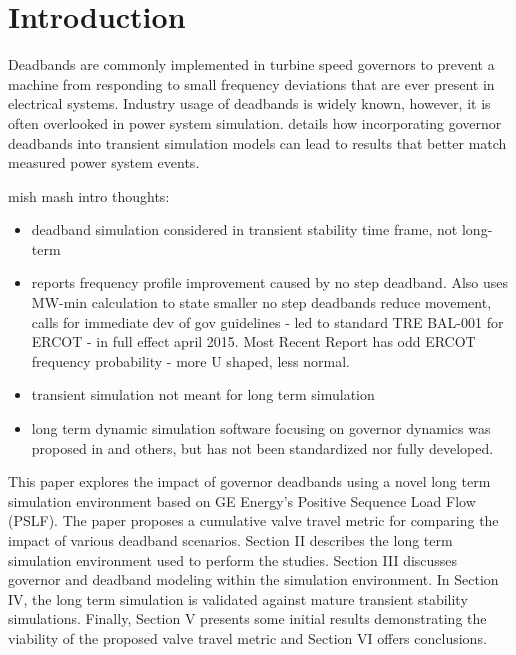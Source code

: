 \section{Introduction}
Deadbands are commonly implemented in turbine speed governors to prevent a machine from responding to small frequency deviations that are ever present in electrical systems.
Industry usage of deadbands is widely known, however, it is often overlooked in power system simulation.
\cite{kou2016} details how incorporating governor deadbands into transient simulation models can lead to results that better match measured power system events.


mish mash intro thoughts:
\begin{itemize}
	\item deadband simulation considered in transient stability time frame, not long-term
	\item \cite{nercFRI2012} reports frequency profile improvement caused by no step deadband. Also uses MW-min calculation to state smaller no step deadbands reduce movement, calls for immediate dev of gov guidelines - led to standard TRE BAL-001 for ERCOT - in full effect april 2015. Most Recent Report \cite{nercFRAA2018} has odd ERCOT frequency probability - more U shaped, less normal.
	\item transient simulation not meant for long term simulation
	\item long term dynamic simulation software focusing on governor dynamics was proposed in \cite{AGCCresap} and others, but has not been standardized nor fully developed.
\end{itemize}


This paper explores the impact of governor deadbands using a novel long term simulation environment based on GE Energy's Positive Sequence Load Flow (PSLF). 
The paper proposes a cumulative valve travel metric for comparing the impact of various deadband scenarios. 
Section II describes the long term simulation environment used to perform the studies. 
Section III discusses governor and deadband modeling within the simulation environment. 
In Section IV, the long term simulation is validated against mature transient stability simulations. 
Finally, Section V presents some initial results demonstrating the viability of the proposed valve travel metric and Section VI offers conclusions.


